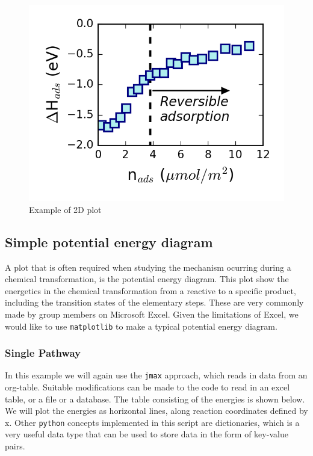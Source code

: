\documentclass[11pt]{article}
\begin{document}
\begin{figure}[htbp]
\centering
\includegraphics[width=.9\linewidth]{./figures/2d-plot.png}
\caption{Example of 2D plot}
\end{figure}

\subsection{Simple potential energy diagram}
\label{sec:org490f4f8}
A plot that is often required when studying the mechanism ocurring during a chemical transformation, is the potential energy diagram. This plot show the energetics in the chemical transformation from a reactive to a specific product, including the transition states of the elementary steps. These are very commonly made by group members on Microsoft Excel. Given the limitations of Excel, we would like to use \texttt{matplotlib} to make a typical potential energy diagram.

\subsubsection{Single Pathway}
\label{sec:orgf3ee713}
In this example we will again use the \texttt{jmax} approach, which reads in data from an org-table. Suitable modifications can be made to the code to read in an excel table, or a file or a database. 
The table consisting of the energies is shown below. We will plot the energies as horizontal lines, along reaction coordinates defined by x. Other \texttt{python} concepts implemented in this script are dictionaries, which is a very useful data type that can be used to store data in the form of key-value pairs.
\end{document}
